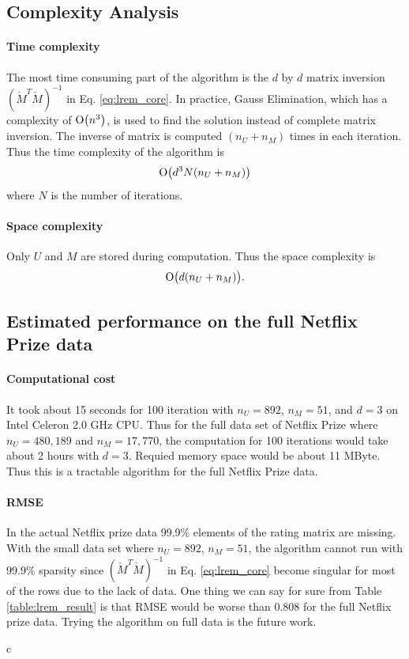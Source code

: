 \documentclass{article}
\begin{document}
\subsection{Complexity Analysis}
\paragraph{Time complexity} 
The most time consuming part of the algorithm is the $d$ by $d$ matrix inversion $(\check{M}^T\check{M})^{-1}$ in Eq. \ref{eq:lrem_core}. In practice, Gauss Elimination, which has a complexity of $\operatorname{O}\bigl(n^3\bigr)$, is used to find the solution instead of complete matrix inversion. The inverse of matrix is computed $(n_U+n_M)$ times in each iteration. Thus the time complexity of the algorithm is 
\begin{equation}
\operatorname{O}\bigl(d^3N(n_U+n_M)\bigr)
\end{equation}
where $N$ is the number of iterations.

\paragraph{Space complexity}
Only $U$ and $M$ are stored during computation. Thus the space complexity is
\begin{equation}
\operatorname{O}\bigl(d(n_U+n_M)\bigr).
\end{equation}

\subsection{Estimated performance on the full Netflix Prize data}
\paragraph{Computational cost}
It took about 15 seconds for 100 iteration with $n_U=892$, $n_M=51$, and $d=3$ on Intel Celeron 2.0 GHz CPU. Thus for the full data set of Netflix Prize where $n_U=480,189$ and $n_M=17,770$, the computation for 100 iterations would take about 2 hours with $d=3$. Requied memory space would be about 11 MByte. Thus this is a tractable algorithm for the full Netflix Prize data.

\paragraph{RMSE}
In the actual Netflix prize data 99.9\% elements of the rating matrix are missing. With the small data set where $n_U=892$, $n_M=51$, the algorithm cannot run with 99.9\% sparsity since $(\check{M}^T\check{M})^{-1}$ in Eq. \ref{eq:lrem_core} become singular for most of the rows due to the lack of data. One thing we can say for sure from Table \ref{table:lrem_result} is that RMSE would be worse than 0.808 for the full Netflix prize data. Trying the algorithm on full data is the future work.



\if c\LaTeXe
\quad
\else
\end{document}
